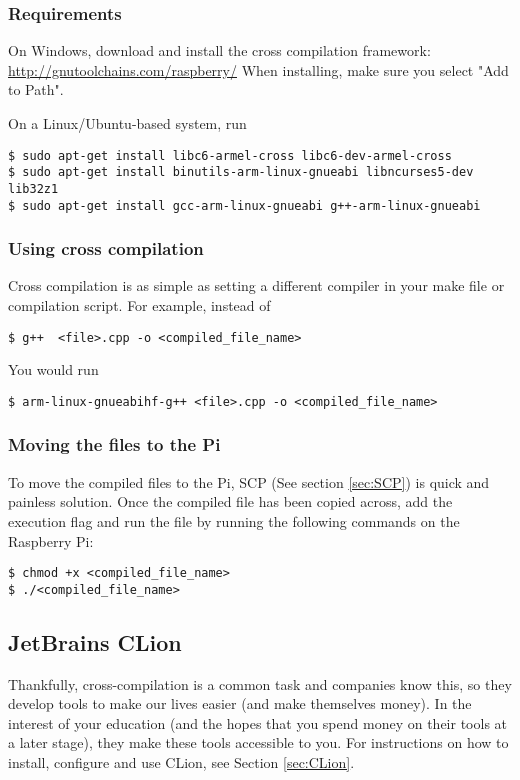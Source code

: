 \subsubsection{Requirements}
On Windows, download and install the cross compilation framework: \newline
\href{http://gnutoolchains.com/raspberry/}{ http://gnutoolchains.com/raspberry/} \newline
When installing, make sure you select "Add to Path".

On a Linux/Ubuntu-based system, run
\begin{lstlisting}
$ sudo apt-get install libc6-armel-cross libc6-dev-armel-cross 
$ sudo apt-get install binutils-arm-linux-gnueabi libncurses5-dev lib32z1
$ sudo apt-get install gcc-arm-linux-gnueabi g++-arm-linux-gnueabi
\end{lstlisting}

\subsubsection{Using cross compilation}
Cross compilation is as simple as setting a different compiler in your make file or compilation script.
For example, instead of 
\begin{lstlisting}
$ g++  <file>.cpp -o <compiled_file_name>
\end{lstlisting}
You would run
\begin{lstlisting}
$ arm-linux-gnueabihf-g++ <file>.cpp -o <compiled_file_name>
\end{lstlisting}

\subsubsection{Moving the files to the Pi}
To move the compiled files to the Pi, SCP (See section \ref{sec:SCP}) is quick and painless solution. 
Once the compiled file has been copied across, add the execution flag and run the file by running the following commands on the Raspberry Pi:
\begin{lstlisting}
$ chmod +x <compiled_file_name>
$ ./<compiled_file_name>
\end{lstlisting}

\subsection{JetBrains CLion}
Thankfully, cross-compilation is a common task and companies know this, so they develop tools to make our lives easier (and make themselves money). In the interest of your education (and the hopes that you spend money on their tools at a later stage), they make these tools accessible to you. For instructions on how to install, configure and use CLion, see Section \ref{sec:CLion}.